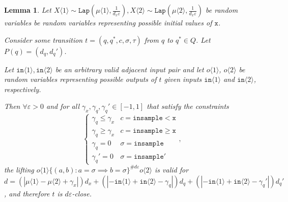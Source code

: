 \documentclass[12pt]{article}
\newcommand{\gguard}[1][x]{\texttt{insample}\geq #1}
\newcommand{\lguard}[1][x]{\texttt{insample} < #1}
\newcommand{\brangle}[1]{\langle #1 \rangle}
\newcommand{\Lap}{\texttt{Lap}}
\newtheorem{lemma}[thm]{Lemma}
\theoremstyle{definition}
\begin{document}
\begin{lemma}\label{indTransitionCoupling}
    Let $X\brangle{1}\sim \Lap(\mu\brangle{1}, \frac{1}{d_x\varepsilon}), X\brangle{2}\sim\Lap(\mu\brangle{2}, \frac{1}{d_x\varepsilon})$ be random variables be random variables representing possible initial values of $\texttt{x}$. 

    Consider some transition $t = (q, q^*, c, \sigma, \tau)$ from $q$ to $q^*\in Q$. Let $P(q) = (d_q, d_q')$.

    Let $\texttt{in}\brangle{1}, \texttt{in}\brangle{2}$ be an arbitrary valid adjacent input pair and let $o\brangle{1}$, $o\brangle{2}$ be random variables representing possible outputs of $t$ given inputs $\texttt{in}\brangle{1}$ and $\texttt{in}\brangle{2}$, respectively. 

    Then $\forall \varepsilon>0$ and for all $\gamma_x, \gamma_q, \gamma_q'\in [-1, 1]$ that satisfy the constraints \[
        \begin{cases}
          \gamma_q\leq\gamma_x & c = \lguard[\texttt{x}]\\
          \gamma_q\geq\gamma_x & c = \gguard[\texttt{x}]\\
          \gamma_q=0 & \sigma = \texttt{insample}\\
          \gamma_q'=0 & \sigma = \texttt{insample}'
        \end{cases},
      \]
      the lifting $o\brangle{1}\{(a, b): a=\sigma\implies b=\sigma\}^{\#d\varepsilon}o\brangle{2}$ is valid for $d = (|\mu\brangle{1}-\mu\brangle{2}+\gamma_x|)d_x+(|-\texttt{in}\brangle{1}+\texttt{in}\brangle{2}-\gamma_q|)d_q+(|-\texttt{in}\brangle{1}+\texttt{in}\brangle{2}-\gamma_q'|)d_q'$, and therefore $t$ is $d\varepsilon$-close. 
\end{lemma}
\end{document}
